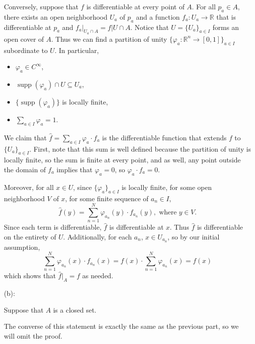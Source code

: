 \documentclass{article}
\theoremstyle{plain} %
\numberwithin{thm}{section} %
\theoremstyle{definition}
\begin{document}
\begin{question}{36}

        Conversely, suppose that \(f\) is differentiable at every point of \(A\). For all \(p_a \in A\), there exists an open neighborhood \(U_a\) of \(p_a\) and a function \(f_a : U_a \to \mathbb{R}\) that is differentiable at \(p_a\) and \(f_a \vert _{U_a \cap A} = f \vert U \cap A\). Notice that \(U = \{U_a\}_{a \in I}\) forms an open cover of \(A\). Thus we can find a partition of unity \(\{ \varphi _a : \mathbb{R}^n \to [0,1]\}_{a\in I}\) subordinate to \(U\). In particular,
        \begin{itemize}
            \item \(\varphi _a \in C^{\infty}\),
            \item \(\mathop{\mathrm{supp}}(\varphi _a)\cap U \subseteq U_a\),
            \item \(\{\mathop{\mathrm{supp}}(\varphi_a)\}\) is locally finite,
            \item \(\sum\limits_{a \in I} \varphi _a = 1\).
        \end{itemize}
        We claim that \(\hat{f} = \sum_{a \in I} \varphi _a \cdot f_a\) is the differentiable function that extends \(f\) to \(\{ U_a \} _{a \in I}\). First, note that this sum is well defined because the partition of unity is locally finite, so the sum is finite at every point, and as well, any point outside the domain of \(f_a\) implies that \(\varphi _a = 0\), so \(\varphi _a \cdot f_a = 0\).

        Moreover, for all \(x \in U\), since \(\{ \varphi _a \}_{a \in I}\) is locally finite, for some open neighborhood \(V\) of \(x\), for some finite sequence of \(a_n \in I\),
        \[
            \hat{f}(y) = \sum_{n=1}^{N} \varphi _{a_n} (y) \cdot f_{a_n}(y), \text{ where } y \in V.
        \]
        Since each term is differentiable, \(\hat{f}\) is differentiable at \(x\). Thus \(\hat{f}\) is differentiable on the entirety of \(U\). Additionally, for each \(a_n\), \(x \in U_{a_n}\), so by our initial assumption,
        \[
            \sum_{n=1}^{N} \varphi _{a_n} (x) \cdot f_{a_n}(x) = f(x) \cdot \sum_{n=1}^{N} \varphi _{a_n} (x) = f(x)
        \]
        which shows that \(\hat{f}\vert _A = f\) as needed.

        \medskip

        (b):

        Suppose that \(A\) is a closed set.

        The converse of this statement is exactly the same as the previous part, so we will omit the proof.


\end{question}
\end{document}
